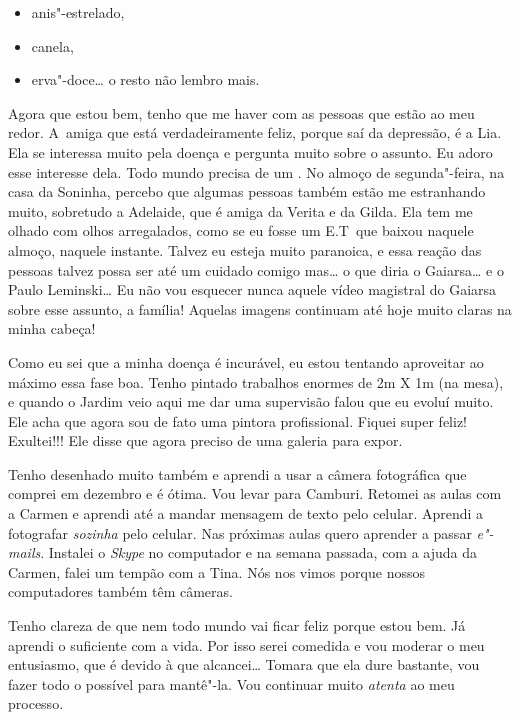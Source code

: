\begin{itemize}
\item
  anis"-estrelado,
\item
  canela,
\item
  erva"-doce… o resto não lembro mais.
\end{itemize}

Agora que estou bem, tenho que me haver com as pessoas que estão ao meu
redor. A~amiga que está verdadeiramente feliz, porque saí da depressão,
é a Lia. Ela se interessa muito pela doença e pergunta muito sobre o
assunto. Eu adoro esse interesse dela. Todo mundo precisa de um 
. No almoço de segunda"-feira, na casa da Soninha, percebo que
algumas pessoas também estão me estranhando muito, sobretudo a Adelaide,
que é amiga da Verita e da Gilda. Ela tem me olhado com olhos
arregalados, como se eu fosse um E.T\, que baixou naquele almoço, naquele
instante. Talvez eu esteja muito paranoica, e essa reação das pessoas
talvez possa ser até um cuidado comigo mas… o que diria o
Gaiarsa… e o Paulo Leminski… Eu não vou esquecer nunca
aquele vídeo magistral do Gaiarsa sobre esse assunto, a família! Aquelas
imagens continuam até hoje muito claras na minha cabeça!

Como eu sei que a minha doença é incurável, eu estou tentando aproveitar
ao máximo essa fase boa. Tenho pintado trabalhos enormes de 2m X 1m (na
mesa), e quando o Jardim veio aqui me dar uma supervisão falou que eu
evoluí muito. Ele acha que agora sou de fato uma pintora profissional.
Fiquei super feliz! Exultei!!! Ele disse que agora preciso de uma
galeria para expor.

Tenho desenhado muito também e aprendi a usar a câmera fotográfica que
comprei em dezembro e é ótima. Vou levar para Camburi. Retomei as aulas
com a Carmen e aprendi até a mandar mensagem de texto pelo celular.
Aprendi a fotografar \emph{sozinha} pelo celular. Nas próximas aulas
quero aprender a passar \emph{e"-mails}. Instalei o \emph{Skype} no
computador e na semana passada, com a ajuda da Carmen, falei um tempão
com a Tina. Nós nos vimos porque nossos computadores também têm câmeras.

Tenho clareza de que nem todo mundo vai ficar feliz porque estou bem. Já
aprendi o suficiente com a vida. Por isso serei comedida e vou moderar o
meu entusiasmo, que é devido à  que alcancei… Tomara
que ela dure bastante, vou fazer todo o possível para mantê"-la. Vou
continuar muito \emph{atenta} ao meu processo.

